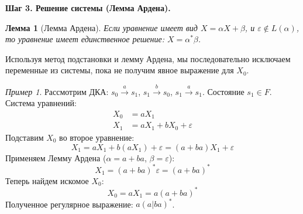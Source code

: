 \documentclass[12pt,a4paper]{article}
\theoremstyle{definition}
\theoremstyle{plain}
\newtheorem{lemma}{Лемма}
\theoremstyle{remark}
\newtheorem{example}{Пример}
\begin{document}
\textbf{Шаг 3. Решение системы (Лемма Ардена).}
\begin{lemma}[Лемма Ардена]
Если уравнение имеет вид $X = \alpha X + \beta$, и $\varepsilon \notin L(\alpha)$, то уравнение имеет единственное решение: $X = \alpha^* \beta$.
\end{lemma}

Используя метод подстановки и лемму Ардена, мы последовательно исключаем переменные из системы, пока не получим явное выражение для $X_0$.

\begin{example}
Рассмотрим ДКА: $s_0 \xrightarrow{a} s_1$, $s_1 \xrightarrow{b} s_0$, $s_1 \xrightarrow{a} s_1$. Состояние $s_1 \in F$.
Система уравнений:
\begin{align*}
    X_0 &= a X_1 \\
    X_1 &= a X_1 + b X_0 + \varepsilon
\end{align*}
Подставим $X_0$ во второе уравнение:
$$ X_1 = a X_1 + b (a X_1) + \varepsilon = (a + ba) X_1 + \varepsilon $$
Применяем Лемму Ардена ($\alpha = a+ba$, $\beta = \varepsilon$):
$$ X_1 = (a + ba)^* \varepsilon = (a + ba)^* $$
Теперь найдем искомое $X_0$:
$$ X_0 = a X_1 = a (a + ba)^* $$
Полученное регулярное выражение: $a(a|ba)^*$.
\end{example}
\end{document}
